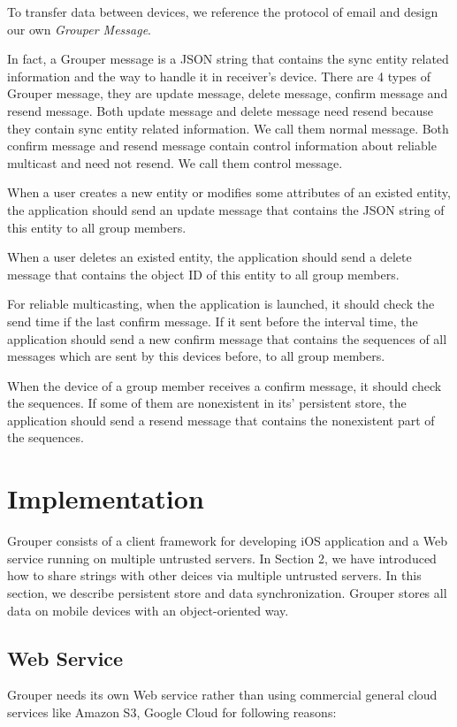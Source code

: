 \documentclass[twocolumn,10pt]{article}
\begin{document}
To transfer data between devices, we reference the protocol of email and design our own \emph{Grouper Message}.

In fact, a Grouper message is a JSON string that contains the sync entity related information and the way to handle it in receiver’s device. There are 4 types of Grouper message, they are update message, delete message, confirm message and resend message. Both update message and delete message need resend because they contain sync entity related information. We call them normal message. Both confirm message and resend message contain control information about reliable multicast and need not resend. We call them control message.

When a user creates a new entity or modifies some attributes of an existed entity, the application should send an update message that contains the JSON string of this entity to all group members.

When a user deletes an existed entity, the application should send a delete message that contains the object ID of this entity to all group members.

For reliable multicasting, when the application is launched, it should check the send time if the last confirm message. If it sent before the interval time, the application should send a new confirm message that contains the sequences of all messages which are sent by this devices before, to all group members.

When the device of a group member receives a confirm message, it should check the sequences. If some of them are nonexistent in its' persistent store, the application should send a resend message that contains the nonexistent part of the sequences.

\section{Implementation}

Grouper consists of a client framework for developing iOS application and a Web service running on multiple untrusted servers. In Section 2, we have introduced how to share strings with other deices via multiple untrusted servers. In this section, we describe persistent store and data synchronization. Grouper stores all data on mobile devices with an object-oriented way.

\subsection{Web Service}
Grouper needs its own Web service rather than using commercial general cloud services like Amazon S3, Google Cloud for following reasons:
\end{document}
